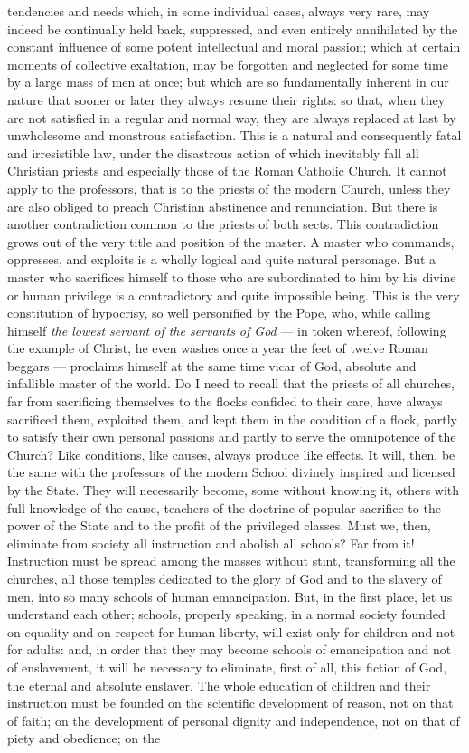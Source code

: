 \documentclass[12pt]{report}
\begin{document}
tendencies and needs which, in some individual cases, always very rare, may indeed be continually held back, suppressed, and even entirely annihilated by the constant influence of some potent intellectual and moral passion; which at certain moments of collective exaltation, may be forgotten and neglected for some time by a large mass of men at once; but which are so fundamentally inherent in our nature that sooner or later they always resume their rights: so that, when they are not satisfied in a regular and normal way, they are always replaced at last by unwholesome and monstrous satisfaction. This is a natural and consequently fatal and irresistible law, under the disastrous action of which inevitably fall all Christian priests and especially those of the Roman Catholic Church. It cannot apply to the professors, that is to the priests of the modern Church, unless they are also obliged to preach Christian abstinence and renunciation. But there is another contradiction common to the priests of both sects. This contradiction grows out of the very title and position of the master. A master who commands, oppresses, and exploits is a wholly logical and quite natural personage. But a master who sacrifices himself to those who are subordinated to him by his divine or human privilege is a contradictory and quite impossible being. This is the very constitution of hypocrisy, so well personified by the Pope, who, while calling himself \emph{the lowest servant of the servants of God} — in token whereof, following the example of Christ, he even washes once a year the feet of twelve Roman beggars — proclaims himself at the same time vicar of God, absolute and infallible master of the world. Do I need to recall that the priests of all churches, far from sacrificing themselves to the flocks confided to their care, have always sacrificed them, exploited them, and kept them in the condition of a flock, partly to satisfy their own personal passions and partly to serve the omnipotence of the Church? Like conditions, like causes, always produce like effects. It will, then, be the same with the professors of the modern School divinely inspired and licensed by the State. They will necessarily become, some without knowing it, others with full knowledge of the cause, teachers of the doctrine of popular sacrifice to the power of the State and to the profit of the privileged classes. Must we, then, eliminate from society all instruction and abolish all schools? Far from it! Instruction must be spread among the masses without stint, transforming all the churches, all those temples dedicated to the glory of God and to the slavery of men, into so many schools of human emancipation. But, in the first place, let us understand each other; schools, properly speaking, in a normal society founded on equality and on respect for human liberty, will exist only for children and not for adults: and, in order that they may become schools of emancipation and not of enslavement, it will be necessary to eliminate, first of all, this fiction of God, the eternal and absolute enslaver. The whole education of children and their instruction must be founded on the scientific development of reason, not on that of faith; on the development of personal dignity and independence, not on that of piety and obedience; on the 
\end{document}
